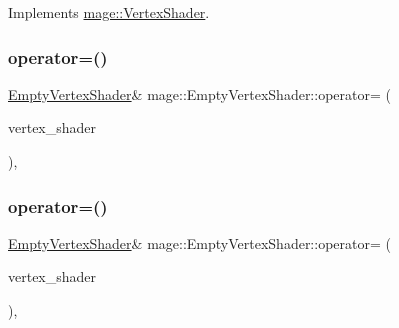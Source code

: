 Implements \hyperlink{classmage_1_1_vertex_shader_acb1c9f6671a7f5f92cdadf2d2a12d43a}{mage\+::\+Vertex\+Shader}.

\hypertarget{classmage_1_1_empty_vertex_shader_a2683d29127405d51737008637ebde098}{}\label{classmage_1_1_empty_vertex_shader_a2683d29127405d51737008637ebde098} 
\subsubsection{\texorpdfstring{operator=()}{operator=()}\hspace{0.1cm}{\footnotesize\ttfamily [1/2]}}
{\footnotesize\ttfamily \hyperlink{classmage_1_1_empty_vertex_shader}{Empty\+Vertex\+Shader}\& mage\+::\+Empty\+Vertex\+Shader\+::operator= (\begin{DoxyParamCaption}\item[{const \hyperlink{classmage_1_1_empty_vertex_shader}{Empty\+Vertex\+Shader} \&}]{vertex\+\_\+shader }\end{DoxyParamCaption})\hspace{0.3cm}{\ttfamily [private]}, {\ttfamily [delete]}}

\hypertarget{classmage_1_1_empty_vertex_shader_a449401b726fc5cd30012a3d8df2e0832}{}\label{classmage_1_1_empty_vertex_shader_a449401b726fc5cd30012a3d8df2e0832} 
\subsubsection{\texorpdfstring{operator=()}{operator=()}\hspace{0.1cm}{\footnotesize\ttfamily [2/2]}}
{\footnotesize\ttfamily \hyperlink{classmage_1_1_empty_vertex_shader}{Empty\+Vertex\+Shader}\& mage\+::\+Empty\+Vertex\+Shader\+::operator= (\begin{DoxyParamCaption}\item[{\hyperlink{classmage_1_1_empty_vertex_shader}{Empty\+Vertex\+Shader} \&\&}]{vertex\+\_\+shader }\end{DoxyParamCaption})\hspace{0.3cm}{\ttfamily [private]}, {\ttfamily [delete]}}

